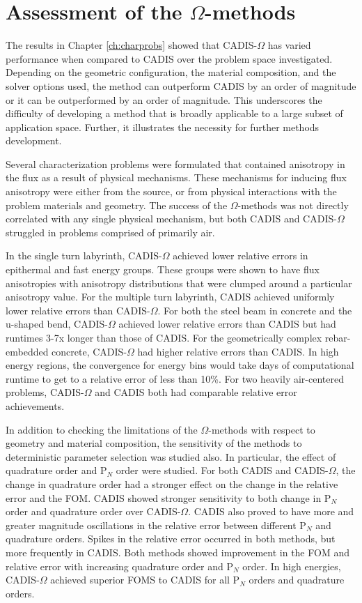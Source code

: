 \section{Assessment of the $\Omega$-methods}
\label{sec:assessments}

The results in Chapter \ref{ch:charprobs} showed that CADIS-$\Omega$ has varied
performance when compared to CADIS over the problem space investigated.
Depending on the geometric configuration, the material composition, and the
solver options used, the method can outperform CADIS by an order of magnitude or
it can be outperformed by an order of magnitude. This underscores the difficulty
of developing a method that is broadly applicable to a large subset of
application space. Further, it illustrates the necessity for further methods
development.

Several characterization problems were formulated that contained anisotropy in the
flux as a result of physical mechanisms. These mechanisms for inducing
flux anisotropy were
either from the source, or from physical interactions with the problem materials
and geometry. The success of the $\Omega$-methods was not directly correlated
with any single physical mechanism, but both CADIS and CADIS-$\Omega$ struggled
in problems comprised of primarily air.

In the single turn labyrinth, CADIS-$\Omega$ achieved lower relative errors in
epithermal and fast energy groups. These groups were shown to have flux
anisotropies with anisotropy distributions that were clumped around a particular
anisotropy value.
For the multiple turn labyrinth, CADIS achieved uniformly lower relative errors
than CADIS-$\Omega$. For both the steel beam in concrete and the u-shaped bend,
CADIS-$\Omega$ achieved lower relative errors than CADIS but had runtimes 3-7x
longer than those of CADIS. For the geometrically complex rebar-embedded
concrete, CADIS-$\Omega$ had higher relative errors than CADIS. In high energy
regions, the convergence for energy bins would take days of computational runtime
to get to a relative error of less than 10\%. For two heavily air-centered
problems, CADIS-$\Omega$ and CADIS both had comparable relative error
achievements.

In addition to checking the limitations of the $\Omega$-methods with respect to
geometry and material composition, the sensitivity of the methods to
deterministic parameter selection was studied also. In particular, the effect of
quadrature order and P$_N$ order were studied. For both CADIS and
CADIS-$\Omega$, the change in quadrature order had a stronger effect on the
change in the relative error and the FOM. CADIS showed stronger sensitivity to
both change in P$_N$ order and quadrature order over CADIS-$\Omega$. CADIS also
proved to have more and greater magnitude oscillations in the relative error
between different P$_N$ and quadrature orders. Spikes in the relative error
occurred in both methods, but more frequently in CADIS. Both
methods showed improvement in the FOM and relative error with increasing
quadrature order and P$_N$ order.
In high energies, CADIS-$\Omega$ achieved superior FOMS to CADIS for all P$_N$
orders and quadrature orders.

